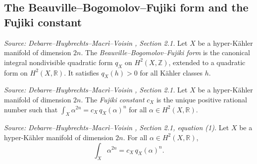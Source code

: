 \subsection{The Beauville--Bogomolov--Fujiki form and the Fujiki constant}

\begin{definition}
  \label{def:bbf-form}
  \textit{Source: Debarre--Huybrechts--Macr\`i--Voisin \cite{MR4654610}, Section 2.1.}
  Let \(X\) be a hyper-K\"ahler manifold of dimension \(2n\).  The
  \emph{Beauville--Bogomolov--Fujiki form} is the canonical integral nondivisible quadratic
  form \(q_X\) on \(H^2(X, \mathbb{Z})\), extended to a quadratic form on
  \(H^2(X, \mathbb{R})\).  It satisfies \(q_X(h) > 0\) for all K\"ahler classes \(h\).
\end{definition}

\begin{definition}
  \label{def:fujiki-constant}
  \textit{Source: Debarre--Huybrechts--Macr\`i--Voisin \cite{MR4654610}, Section 2.1.}
  Let \(X\) be a hyper-K\"ahler manifold of dimension \(2n\).  The \emph{Fujiki constant}
  \(c_X\) is the unique positive rational number such that
  \(\int_X \alpha^{2n} = c_X\, q_X(\alpha)^n\) for all \(\alpha \in H^2(X, \mathbb{R})\).
\end{definition}

\begin{lemma}
  \label{lem:fujiki-relation}
  \textit{Source: Debarre--Huybrechts--Macr\`i--Voisin \cite{MR4654610}, Section 2.1, equation (1).}
  Let \(X\) be a hyper-K\"ahler manifold of dimension \(2n\).  For all
  \(\alpha \in H^2(X, \mathbb{R})\),
  \[
    \int_X \alpha^{2n} = c_X\, q_X(\alpha)^n.
  \]
\end{lemma}

